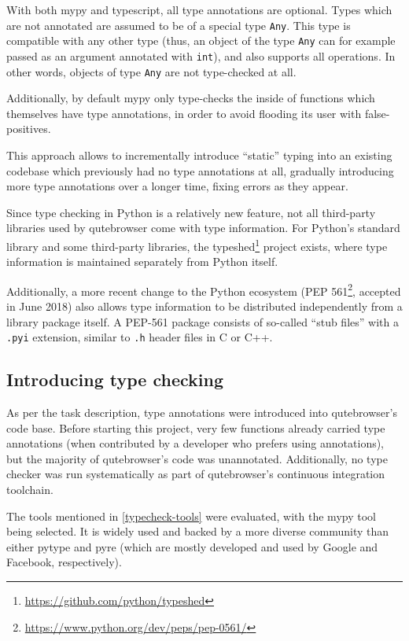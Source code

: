 With both mypy and typescript, all type annotations are optional. Types which
are not annotated are assumed to be of a special type \verb|Any|. This type is
compatible with any other type (thus, an object of the type \verb|Any| can for
example passed as an argument annotated with \verb|int|), and also supports all
operations. In other words, objects of type \verb|Any| are not type-checked at
all.

Additionally, by default mypy only type-checks the inside of functions which
themselves have type annotations, in order to avoid flooding its user with
false-positives.

This approach allows to incrementally introduce ``static'' typing into an
existing codebase which previously had no type annotations at all, gradually
introducing more type annotations over a longer time, fixing errors as they
appear.

Since type checking in Python is a relatively new feature, not all third-party
libraries used by qutebrowser come with type information. For Python's standard
library and some third-party libraries, the
typeshed\footnote{\url{https://github.com/python/typeshed}} project exists,
where type information is maintained separately from Python itself.

\label{pep561}
Additionally, a more recent change to the Python ecosystem (PEP
561\footnote{\url{https://www.python.org/dev/peps/pep-0561/}}, accepted in June
2018) also allows type information to be distributed independently from a
library package itself. A PEP-561 package consists of
so-called ``stub files'' with a \verb|.pyi| extension, similar to \verb|.h|
header files in C or C++.

\subsection{Introducing type checking}
As per the task description, type annotations were introduced into qutebrowser's
code base. Before starting this project, very few functions already carried type
annotations (when contributed by a developer who prefers using annotations),
but the majority of qutebrowser's code was unannotated. Additionally, no type
checker was run systematically as part of qutebrowser's continuous integration
toolchain.

The tools mentioned in \ref{typecheck-tools} were evaluated, with the mypy tool
being selected. It is widely used and backed by a more diverse community
than either pytype and pyre (which are mostly developed and used by Google and
Facebook, respectively).

